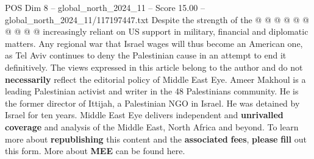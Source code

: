 \begin{textsample}{POS Dim 8 – global\_north\_2024\_11 – Score 15.00 – global\_north\_2024\_11/117197447.txt}
Despite the strength of the @ @ @ @ @ @ @ @ @ @ increasingly reliant on US support in military, financial and diplomatic matters.
Any regional war that Israel wages will thus become an American one, as Tel Aviv continues to deny the Palestinian cause in an attempt to end it definitively.
The views expressed in this article belong to the author and do not \textbf{necessarily} reflect the editorial policy of Middle East Eye.
Ameer Makhoul is a leading Palestinian activist and writer in the 48 Palestinians community.
He is the former director of Ittijah, a Palestinian NGO in Israel.
He was detained by Israel for ten years.
Middle East Eye delivers independent and \textbf{unrivalled} \textbf{coverage} and analysis of the Middle East, North Africa and beyond.
To learn more about \textbf{republishing} this content and the \textbf{associated} \textbf{fees}, \textbf{please} \textbf{fill} out this form.
More about \textbf{MEE} can be found here.

\end{textsample}
